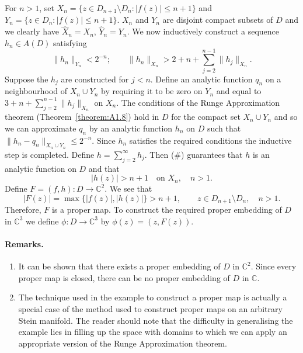 For $n>1$, set $X_n=\{z\in D_{n+1}\setminus D_n:|f(z)|\leq n+1\}$ and $Y_n=\{z\in D_n:|f(z)|\leq n+1\}$. $X_n$ and $Y_n$ are disjoint compact subsets of $D$ and we clearly have $\widehat X_n=X_n$, $\widehat Y_n=Y_n$. We now inductively construct a sequence $h_n\in A(D)$ satisfying
\[
\|h_n\|_{Y_n}<2^{-n};\qquad \|h_n\|_{X_n}>2+n+\sum_{j=2}^{n-1}\|h_j\|_{X_n}.\tag{\#}\label{eq:4:star:2}
\]
Suppose the $h_j$ are constructed for $j<n$. Define an analytic function $q_n$ on a neighbourhood of $X_n\cup Y_n$ by requiring it to be zero on $Y_n$ and equal to $3+n+\sum_{j=2}^{n-1}\|h_j\|_{X_n}$ on $X_n$. The conditions of the Runge Approximation theorem (Theorem~\ref{theorem:A1.8}) hold in $D$ for the compact set $X_n\cup Y_n$ and so we can approximate $q_n$ by an analytic function $h_n$ on $D$ such that $\|h_n-q_n\|_{X_n\cup Y_n}\leq2^{-n}$. Since $h_n$ satisfies the required conditions the inductive step is completed. Define $h=\sum_{j=2}^\infty h_j$. Then (\#) guarantees that $h$ is an analytic function on $D$ and that
\[
|h(z)|>n+1\quad\text{on }X_n,\quad n>1.
\]
Define $F=(f,h):D\longrightarrow\mathbb C^2$. We see that
\[
|F(z)|=\max\{|f(z)|,|h(z)|\}>n+1,\qquad z\in D_{n+1}\setminus D_n,\quad n>1.
\]
Therefore, $F$ is a proper map. To construct the required proper embedding of $D$ in $\mathbb C^3$ we define $\phi:D\longrightarrow\mathbb C^3$ by $\phi(z)=(z,F(z))$.

\paragraph*{Remarks.}
\begin{enumerate}
\item It can be shown that there exists a proper embedding of $D$ in $\mathbb C^2$. Since every proper map is closed, there can be no proper embedding of $D$ in $\mathbb C$.
\item The technique used in the example to construct a proper map is actually a special case of the method used to construct proper maps on an arbitrary Stein manifold. The reader should note that the difficulty in generalising the example lies in filling up the space with domains to which we can apply an appropriate version of the Runge Approximation theorem.
\end{enumerate}
